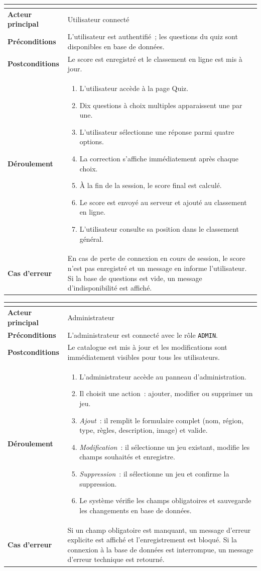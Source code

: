 \documentclass[12pt,a4paper]{report}
\newcommand{\uctable}[7]{%
\renewcommand{\arraystretch}{1.55}
\begin{tabular}{|>{\bfseries\color{darkgray}}p{3.8cm}|p{10cm}|}
\hline
\multicolumn{2}{|l|}{\cellcolor{#1!18}\textbf{\textcolor{#1}{#2}}} \\
\hline
Acteur principal   & #3 \\
\hline
Préconditions      & #4 \\
\hline
Postconditions     & #5 \\
\hline
Déroulement        & #6 \\
\hline
Cas d'erreur       & #7 \\
\hline
\end{tabular}
\renewcommand{\arraystretch}{1}}
\begin{document}
\bigskip

\noindent\uctable{ucblue}%
  {UC4 -- Passer le quiz et consulter le classement}%
  {Utilisateur connecté}%
  {L'utilisateur est authentifié~; les questions du quiz sont disponibles en base de données.}%
  {Le score est enregistré et le classement en ligne est mis à jour.}%
  {\begin{enumerate}[leftmargin=1.2em,topsep=0pt,itemsep=1pt]
     \item L'utilisateur accède à la page Quiz.
     \item Dix questions à choix multiples apparaissent une par une.
     \item L'utilisateur sélectionne une réponse parmi quatre options.
     \item La correction s'affiche immédiatement après chaque choix.
     \item À la fin de la session, le score final est calculé.
     \item Le score est envoyé au serveur et ajouté au classement en ligne.
     \item L'utilisateur consulte sa position dans le classement général.
   \end{enumerate}}%
  {En cas de perte de connexion en cours de session, le score n'est pas enregistré et
   un message en informe l'utilisateur. Si la base de questions est vide, un message
   d'indisponibilité est affiché.}

\bigskip

\noindent\uctable{uccoral}%
  {UC5 -- Gérer le catalogue (Administrateur)}%
  {Administrateur}%
  {L'administrateur est connecté avec le rôle \texttt{ADMIN}.}%
  {Le catalogue est mis à jour et les modifications sont immédiatement visibles
   pour tous les utilisateurs.}%
  {\begin{enumerate}[leftmargin=1.2em,topsep=0pt,itemsep=1pt]
     \item L'administrateur accède au panneau d'administration.
     \item Il choisit une action~: ajouter, modifier ou supprimer un jeu.
     \item \textit{Ajout}~: il remplit le formulaire complet (nom, région, type, règles,
           description, image) et valide.
     \item \textit{Modification}~: il sélectionne un jeu existant, modifie les champs
           souhaités et enregistre.
     \item \textit{Suppression}~: il sélectionne un jeu et confirme la suppression.
     \item Le système vérifie les champs obligatoires et sauvegarde les changements
           en base de données.
   \end{enumerate}}%
  {Si un champ obligatoire est manquant, un message d'erreur explicite est affiché
   et l'enregistrement est bloqué. Si la connexion à la base de données est interrompue,
   un message d'erreur technique est retourné.}
\end{document}
